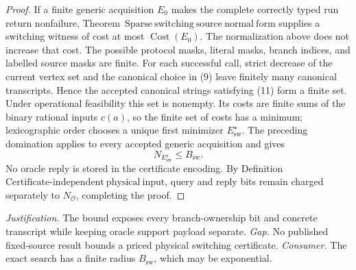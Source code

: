 \documentclass{article}
\begin{document}
\begin{proof}
If a finite generic acquisition \(E_0\) makes the complete correctly typed run return nonfailure, Theorem~\(\mathrm{Sparse\ switching\ source\ normal\ form}\) supplies a switching witness of cost at most \(\operatorname{Cost}(E_0)\).  The normalization above does not increase that cost.  The possible protocol masks, literal masks, branch indices, and labelled source masks are finite.  For each successful call, strict decrease of the current vertex set and the canonical choice in (9) leave finitely many canonical transcripts.  Hence the accepted canonical strings satisfying (11) form a finite set.  Under operational feasibility this set is nonempty.  Its costs are finite sums of the binary rational inputs \(c(a)\), so the finite set of costs has a minimum; lexicographic order chooses a unique first minimizer \(E_{\mathrm{sw}}^{\star}\).  The preceding domination applies to every accepted generic acquisition and gives
\[
 N_{E_{\mathrm{sw}}^{\star}}\leq B_{\mathrm{sw}}.
 \tag{12}
\]
No oracle reply is stored in the certificate encoding.  By Definition~\(\mathrm{Certificate\mbox{-}independent\ physical\ input}\), query and reply bits remain charged separately to \(N_{\mathcal O}\), completing the proof.
\end{proof}
\par\smallskip\noindent \textit{Justification.} The bound exposes every branch-ownership bit and concrete transcript while keeping oracle support payload separate. \textit{Gap.} No published fixed-source result bounds a priced physical switching certificate. \textit{Consumer.} The exact search has a finite radius \(B_{\mathrm{sw}}\), which may be exponential.
\end{document}
